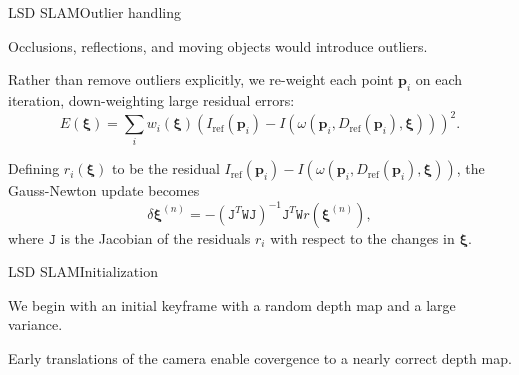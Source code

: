 \documentclass[aspectratio=169]{beamer}
\renewcommand{\vec}[1]{\boldsymbol{#1}}
\newcommand{\mat}[1]{\mathtt{#1}}
\newcommand{\myfig}[3]{\centerline{\texttt{[image: \#2]}}
    \centerline{\scriptsize \begin{minipage}{#1} \centering #3 \end{minipage}}}
\begin{document}
\begin{frame}{LSD SLAM}{Outlier handling}

  Occlusions, reflections, and moving objects would introduce \alert{outliers}.

  \medskip

  Rather than remove outliers explicitly, we re-weight each point
  $\vec{p}_i$ on each iteration, down-weighting large residual errors:
  $$E(\vec{\xi}) = \sum_i w_i(\vec{\xi}) (I_{\textrm{ref}}(\vec{p}_i) - I(\omega(\vec{p}_i,
  D_{\textrm{ref}}(\vec{p}_i), \vec{\xi})))^2.$$

  Defining $r_i(\vec{\xi})$ to be the residual
  $I_{\textrm{ref}}(\vec{p}_i) - I(\omega(\vec{p}_i,
  D_{\textrm{ref}}(\vec{p}_i), \vec{\xi}))$, the Gauss-Newton update
  becomes
  $$\delta \vec{\xi}^{(n)} =
  -(\mat{J}^T\mat{W}\mat{J})^{-1}\mat{J}^T\mat{W}r(\vec{\xi}^{(n)}),$$
  where $\mat{J}$ is the Jacobian of the residuals $r_i$ with respect
  to the changes in $\vec{\xi}$.

\end{frame}




\begin{frame}{LSD SLAM}{Initialization}

  We begin with an initial keyframe with a \alert{random} depth map
  and a large variance.

  \medskip

  Early translations of the camera enable covergence to a nearly
  correct depth map.

\end{frame}
\end{document}
